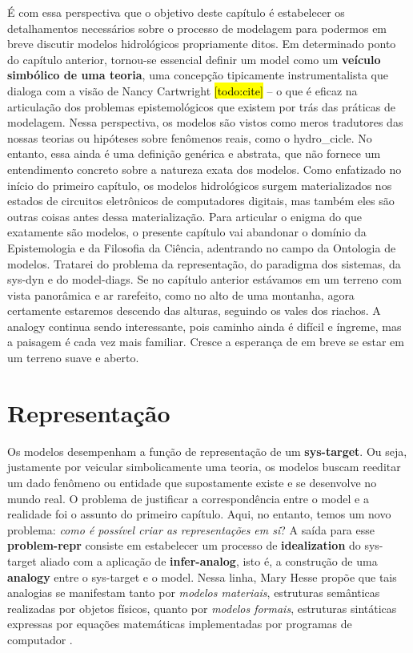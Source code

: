 \documentclass[./main.tex]{subfiles}
\begin{document}
\par É com essa perspectiva que o objetivo deste capítulo é estabelecer os detalhamentos necessários sobre o processo de modelagem para podermos em breve discutir modelos hidrológicos propriamente ditos. Em determinado ponto do capítulo anterior, tornou-se essencial definir um \gls{model} como um \textbf{veículo simbólico de uma teoria}, uma concepção tipicamente instrumentalista que dialoga com a visão de Nancy Cartwright \hl{[todo:cite]} -- o que é eficaz na articulação dos problemas epistemológicos que existem por trás das práticas de modelagem. Nessa perspectiva, os modelos são vistos como meros tradutores das nossas teorias ou hipóteses sobre fenômenos reais, como o \gls{hydro_cicle}. No entanto, essa ainda é uma definição genérica e abstrata, que não fornece um entendimento concreto sobre a natureza exata dos modelos. Como enfatizado no início do primeiro capítulo, os modelos hidrológicos surgem materializados nos estados de circuitos eletrônicos de computadores digitais, mas também eles são outras coisas antes dessa materialização. Para articular o enigma do que exatamente são modelos, o presente capítulo vai abandonar o domínio da Epistemologia e da Filosofia da Ciência, adentrando no campo da Ontologia de modelos. Tratarei do problema da representação, do \gls{paradigma} dos sistemas, da \gls{sys-dyn} e do \gls{model-diags}. Se no capítulo anterior estávamos em um terreno com vista panorâmica e ar rarefeito, como no alto de uma montanha, agora certamente estaremos descendo das alturas, seguindo os vales dos riachos. A \gls{analogy} continua sendo interessante, pois caminho ainda é difícil e íngreme, mas a paisagem é cada vez mais familiar. Cresce a esperança de em breve se estar em um terreno suave e aberto.

\section{Representação} \label{sec:sys:represent}

\par Os modelos desempenham a função de representação de um \textbf{\gls{sys-target}}. Ou seja, justamente por veicular simbolicamente uma \gls{teoria}, os modelos buscam reeditar um dado fenômeno ou entidade que supostamente existe e se desenvolve no mundo real. O problema de justificar a correspondência entre o \gls{model} e a realidade foi o assunto do primeiro capítulo. Aqui, no entanto, temos um novo problema: \textit{como é possível criar as representações em si}? A saída para esse \textbf{\gls{problem-repr}} consiste em estabelecer um processo de \textbf{\gls{idealization}} do \gls{sys-target} aliado com a aplicação de \textbf{\gls{infer-analog}}, isto é, a construção de uma \textbf{\gls{analogy}} entre o \gls{sys-target} e o \gls{model}. Nessa linha, Mary Hesse propõe que tais analogias se manifestam tanto por \textit{modelos materiais}, estruturas semânticas realizadas por objetos físicos, quanto por \textit{modelos formais}, estruturas sintáticas expressas por equações matemáticas implementadas por programas de computador \cite{hesse2017}.
\end{document}
